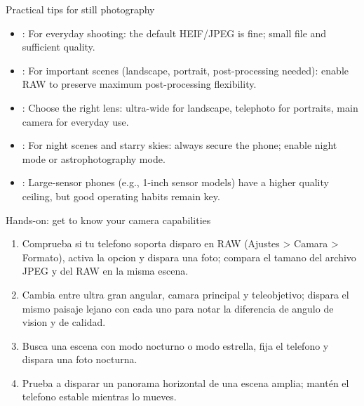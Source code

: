 \begin{tcbinfo}{Practical tips for still photography}
\begin{itemize}
  \item : For everyday shooting: the default HEIF/JPEG is fine; small file and sufficient quality.
  \item : For important scenes (landscape, portrait, post-processing needed): enable RAW to preserve maximum post-processing flexibility.
  \item : Choose the right lens: ultra-wide for landscape, telephoto for portraits, main camera for everyday use.
  \item : For night scenes and starry skies: always secure the phone; enable night mode or astrophotography mode.
  \item : Large-sensor phones (e.g., 1-inch sensor models) have a higher quality ceiling, but good operating habits remain key.
\end{itemize}

\end{tcbinfo}

\begin{tcbpractice}{Hands-on: get to know your camera capabilities}
\begin{enumerate}
  \item Comprueba si tu telefono soporta disparo en RAW (Ajustes > Camara > Formato), activa la opcion y dispara una foto; compara el tamano del archivo JPEG y del RAW en la misma escena.
  \item Cambia entre ultra gran angular, camara principal y teleobjetivo; dispara el mismo paisaje lejano con cada uno para notar la diferencia de angulo de vision y de calidad.
  \item Busca una escena con modo nocturno o modo estrella, fija el telefono y dispara una foto nocturna.
  \item Prueba a disparar un panorama horizontal de una escena amplia; mantén el telefono estable mientras lo mueves.
\end{enumerate}

\end{tcbpractice}

